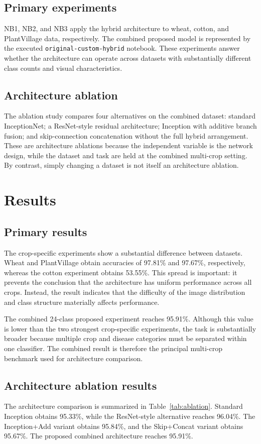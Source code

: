 \documentclass[a4paper,fleqn]{cas-dc}
\begin{document}
\subsection{Primary experiments}
NB1, NB2, and NB3 apply the hybrid architecture to wheat, cotton, and PlantVillage data, respectively. The combined proposed model is represented by the executed \texttt{original-custom-hybrid} notebook. These experiments answer whether the architecture can operate across datasets with substantially different class counts and visual characteristics.

\subsection{Architecture ablation}
The ablation study compares four alternatives on the combined dataset: standard InceptionNet; a ResNet-style residual architecture; Inception with additive branch fusion; and skip-connection concatenation without the full hybrid arrangement. These are architecture ablations because the independent variable is the network design, while the dataset and task are held at the combined multi-crop setting. By contrast, simply changing a dataset is not itself an architecture ablation.

\section{Results}
\subsection{Primary results}
The crop-specific experiments show a substantial difference between datasets. Wheat and PlantVillage obtain accuracies of 97.81\% and 97.67\%, respectively, whereas the cotton experiment obtains 53.55\%. This spread is important: it prevents the conclusion that the architecture has uniform performance across all crops. Instead, the result indicates that the difficulty of the image distribution and class structure materially affects performance.

The combined 24-class proposed experiment reaches 95.91\%. Although this value is lower than the two strongest crop-specific experiments, the task is substantially broader because multiple crop and disease categories must be separated within one classifier. The combined result is therefore the principal multi-crop benchmark used for architecture comparison.

\subsection{Architecture ablation results}
The architecture comparison is summarized in Table~\ref{tab:ablation}. Standard Inception obtains 95.33\%, while the ResNet-style alternative reaches 96.04\%. The Inception+Add variant obtains 95.84\%, and the Skip+Concat variant obtains 95.67\%. The proposed combined architecture reaches 95.91\%.
\end{document}
